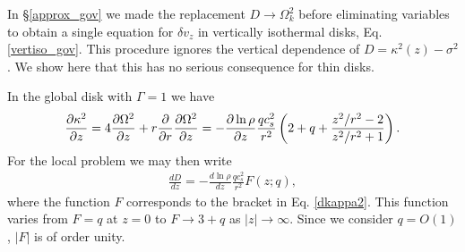 In \S\ref{approx_gov} we made the replacement $D\to\Omega_k^2$ before
eliminating variables to obtain a single equation for $\delta v_z$ in
vertically isothermal disks, Eq. \ref{vertiso_gov}.  
This procedure ignores the vertical dependence of
$D=\kappa^2(z) - \sigma^2$. We show here that this has no serious 
consequence for thin disks. 

In the global disk with $\Gamma=1$ we have
\begin{align}\label{dkappa2}
  \frac{\partial\kappa^2}{\partial z} = 4 \frac{\partial\Omega^2}{\partial z} + r\frac{\partial}{\partial
    r}\frac{\partial\Omega^2}{\partial z} = -
  \frac{\partial\ln\rho}{\partial z}\frac{qc_s^2}{r^2} \left(2 + q +
    \frac{z^2/r^2-2}{z^2/r^2+1}\right). 
\end{align}
For the local problem we may then write
\begin{align}
  \frac{dD}{dz}  = - \frac{d\ln\rho}{dz}\frac{qc_s^2}{r^2}F(z;q),
\end{align}
where the function $F$ corresponds to the bracket in
Eq. \ref{dkappa2}. This function varies from $F=q$ at $z=0$ to $F\to
3+q$ as $|z|\to\infty$. Since we consider $q=O(1)$, $|F|$ is of
order unity.  

